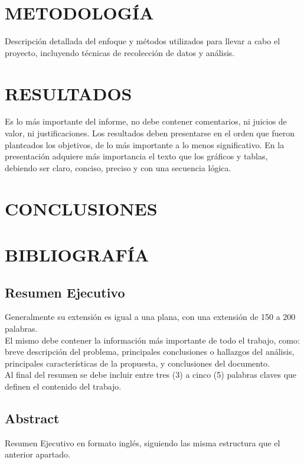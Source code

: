 \documentclass[12pt,letterpaper]{report}
\begin{document}
{\begin{multicols}{2}
	\section*{METODOLOGÍA}
	Descripción detallada del enfoque y métodos utilizados para llevar a cabo el proyecto, incluyendo técnicas de recolección de datos y análisis.
	
	\section*{RESULTADOS}
	Es lo más importante del informe, no debe
contener comentarios, ni juicios de valor, ni
justificaciones.
Los resultados deben presentarse en el orden que fueron planteados los objetivos, de
lo más importante a lo menos significativo.
En la presentación adquiere más importancia el texto que los gráficos y tablas, debiendo ser claro, conciso, preciso y con una
secuencia lógica.
	\section*{CONCLUSIONES}
	\section*{BIBLIOGRAFÍA}
	\end{multicols}
	
	}
	
	\newpage
	\begin{center}
	\section*{Resumen Ejecutivo}
	\end{center}
	Generalmente su extensión es igual a una plana, con una extensión de 150 a 200 palabras.\\
El mismo debe contener la información más importante de todo el trabajo, como:
breve descripción del problema, principales conclusiones o hallazgos del análisis,
principales características de la propuesta, y conclusiones del documento.\\
Al final del resumen se debe incluir entre tres (3) a cinco (5) palabras claves que
definen el contenido del trabajo.
	\thispagestyle{empty}
	\newpage
	\begin{center}
	\section*{Abstract}
	Resumen Ejecutivo en formato inglés, siguiendo las misma estructura que el anterior apartado.
	
	\end{center}
	
\end{document}

